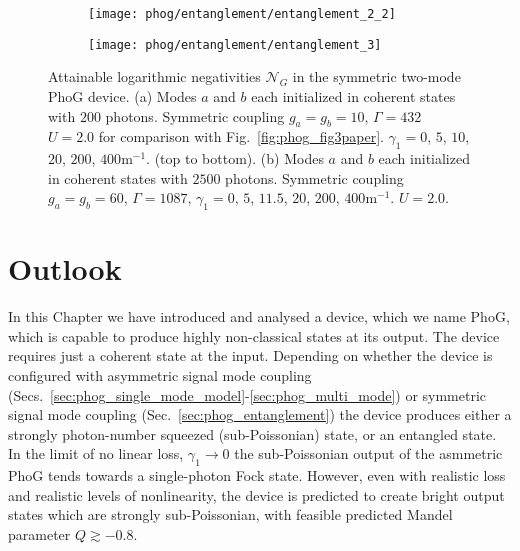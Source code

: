 
\begin{figure}[htp]
\captionsetup{width=0.8\linewidth}
\centering
	\begin{subfigure}{0.7\linewidth}
	\centering
	\caption{}
	\texttt{[image: phog/entanglement/entanglement\_2\_2]}
	\end{subfigure}
	\begin{subfigure}{0.7\linewidth}
	\centering
	\caption{}
	\texttt{[image: phog/entanglement/entanglement\_3]}
	\end{subfigure}
	\caption{\label{fig:phog_negativities} Attainable logarithmic negativities $\mathcal{N}_G$ in the symmetric two-mode PhoG device. (a) Modes $a$ and $b$ each initialized in coherent states with $200$ photons. Symmetric coupling $g_a = g_b = 10$, $\Gamma=432$ $U=2.0$ for comparison with Fig.~\ref{fig:phog_fig3paper}. $\gamma_1 = 0$, $5$, $10$, $20$, $200$, $400$m$^{-1}$. (top to bottom). (b) Modes $a$ and $b$ each initialized in coherent states with $2500$ photons. Symmetric coupling $g_a = g_b = 60$, $\Gamma = 1087$, $\gamma_1 = 0$, $5$, $11.5$, $20$, $200$, $400$m$^{-1}$. $U = 2.0$.}
\end{figure}


\section{Outlook}\label{sec:phog_outlook}
In this Chapter we have introduced and analysed a device, which we name PhoG, which is capable to produce highly non-classical states at its output. The device requires just a coherent state at the input. Depending on whether the device is configured with asymmetric signal mode coupling (Secs.~\ref{sec:phog_single_mode_model}-\ref{sec:phog_multi_mode}) or symmetric signal mode coupling (Sec.~\ref{sec:phog_entanglement}) the device produces either a strongly photon-number squeezed (sub-Poissonian) state, or an entangled state. In the limit of no linear loss, $\gamma_1 \rightarrow 0$ the sub-Poissonian output of the asmmetric PhoG tends towards a single-photon Fock state. However, even with realistic loss and realistic levels of nonlinearity, the device is predicted to create bright output states which are strongly sub-Poissonian, with feasible predicted Mandel parameter $Q \gtrsim -0.8$.

